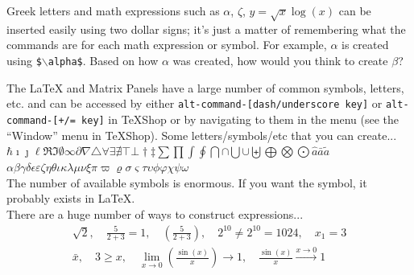 \documentclass[11pt]{article} %
\begin{document}
Greek letters and math expressions such as $\alpha$, $\zeta$, $y=\sqrt{x}\log(x)$ can be inserted easily using two dollar signs; it's just a matter of remembering what the commands are for each math expression or symbol. For example, $\alpha$ is created using \texttt{\$$\backslash$alpha\$}. Based on how $\alpha$ was created, how would you think to create $\beta$?

The LaTeX and Matrix Panels have a large number of common symbols, letters, etc. and can be accessed by either \texttt{alt-command-[dash/underscore key]} or \texttt{alt-command-[+/= key]} in TeXShop or by navigating to them in the menu (see the ``Window'' menu in TeXShop). Some letters/symbols/etc that you can create... \\

$\hbar\imath\jmath\ell\Re\Im\emptyset\infty\partial\nabla\triangle\forall\exists\nexists\top\bot\dag\ddag\sum\prod\int\oint\bigcap\cap\bigcup\cup\biguplus\bigoplus\bigotimes\bigodot\hat{a}\bar{a}\tilde{a}$ \\

$\alpha\beta\gamma\delta\epsilon\varepsilon\zeta\eta\theta\iota\kappa\lambda\mu\nu\xi\pi\varpi\varrho
\sigma\varsigma\tau\upsilon\phi\varphi\chi\psi\omega$ \\

The number of available symbols is enormous. If you want the symbol, it probably exists in LaTeX. \\


There are a huge number of ways to construct expressions...
\begin{eqnarray*} %
\sqrt{2}, \quad \frac{5}{2+3}=1, \quad \left(\frac{5}{2+3}\right), \quad 2^10 \neq 2^{10} = 1024, \quad x_1 = 3 \\
\bar{x}, \quad 3 \geq x, \quad \lim_{x\to0}\left( \frac{\sin(x)}{x} \right) \to 1, \quad \frac{\sin(x)}{x}\stackrel{x\to0}{\to} 1
\end{eqnarray*}
\end{document}
